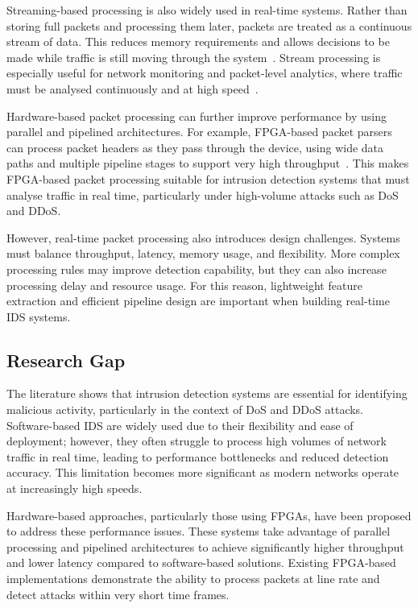 Streaming-based processing is also widely used in real-time systems. Rather than storing full packets and processing them later, packets are treated as a continuous stream of data. This reduces memory requirements and allows decisions to be made while traffic is still moving through the system~\cite{bulajoul_network_2013}. Stream processing is especially useful for network monitoring and packet-level analytics, where traffic must be analysed continuously and at high speed~\cite{yazdinejad_high-performance_2020}.

Hardware-based packet processing can further improve performance by using parallel and pipelined architectures. For example, FPGA-based packet parsers can process packet headers as they pass through the device, using wide data paths and multiple pipeline stages to support very high throughput~\cite{attig_400_2011}. This makes FPGA-based packet processing suitable for intrusion detection systems that must analyse traffic in real time, particularly under high-volume attacks such as DoS and DDoS.

However, real-time packet processing also introduces design challenges. Systems must balance throughput, latency, memory usage, and flexibility. More complex processing rules may improve detection capability, but they can also increase processing delay and resource usage. For this reason, lightweight feature extraction and efficient pipeline design are important when building real-time IDS systems.


\subsection{Research Gap}
The literature shows that intrusion detection systems are essential for identifying malicious activity, particularly in the context of DoS and DDoS attacks. Software-based IDS are widely used due to their flexibility and ease of deployment; however, they often struggle to process high volumes of network traffic in real time, leading to performance bottlenecks and reduced detection accuracy. This limitation becomes more significant as modern networks operate at increasingly high speeds.

Hardware-based approaches, particularly those using FPGAs, have been proposed to address these performance issues. These systems take advantage of parallel processing and pipelined architectures to achieve significantly higher throughput and lower latency compared to software-based solutions. Existing FPGA-based implementations demonstrate the ability to process packets at line rate and detect attacks within very short time frames.

